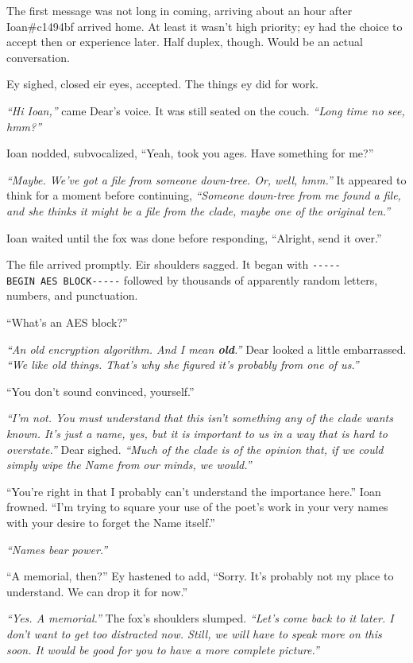 The first message was not long in coming, arriving about an hour after Ioan\#c1494bf arrived home. At least it wasn't high priority; ey had the choice to accept then or experience later. Half duplex, though. Would be an actual conversation.

Ey sighed, closed eir eyes, accepted. The things ey did for work.

\emph{``Hi Ioan,''} came Dear's voice. It was still seated on the couch. \emph{``Long time no see, hmm?''}

Ioan nodded, subvocalized, ``Yeah, took you ages. Have something for me?''

\emph{``Maybe. We've got a file from someone down-tree. Or, well, hmm.''} It appeared to think for a moment before continuing, \emph{``Someone down-tree from me found a file, and she thinks it might be a file from the clade, maybe one of the original ten.''}

Ioan waited until the fox was done before responding, ``Alright, send it over.''

The file arrived promptly. Eir shoulders sagged. It began with \texttt{-\/-\/-\/-\/-BEGIN\ AES\ BLOCK-\/-\/-\/-\/-} followed by thousands of apparently random letters, numbers, and punctuation.

``What's an AES block?''

\emph{``An old encryption algorithm. And I mean \textbf{old}.''} Dear looked a little embarrassed. \emph{``We like old things. That's why she figured it's probably from one of us.''}

``You don't sound convinced, yourself.''

\emph{``I'm not. You must understand that this isn't something any of the clade wants known. It's just a name, yes, but it is important to us in a way that is hard to overstate.''} Dear sighed. \emph{``Much of the clade is of the opinion that, if we could simply wipe the Name from our minds, we would.''}

``You're right in that I probably can't understand the importance here.'' Ioan frowned. ``I'm trying to square your use of the poet's work in your very names with your desire to forget the Name itself.''

\emph{``Names bear power.''}

``A memorial, then?'' Ey hastened to add, ``Sorry. It's probably not my place to understand. We can drop it for now.''

\emph{``Yes. A memorial.''} The fox's shoulders slumped. \emph{``Let's come back to it later. I don't want to get too distracted now. Still, we will have to speak more on this soon. It would be good for you to have a more complete picture.''}

